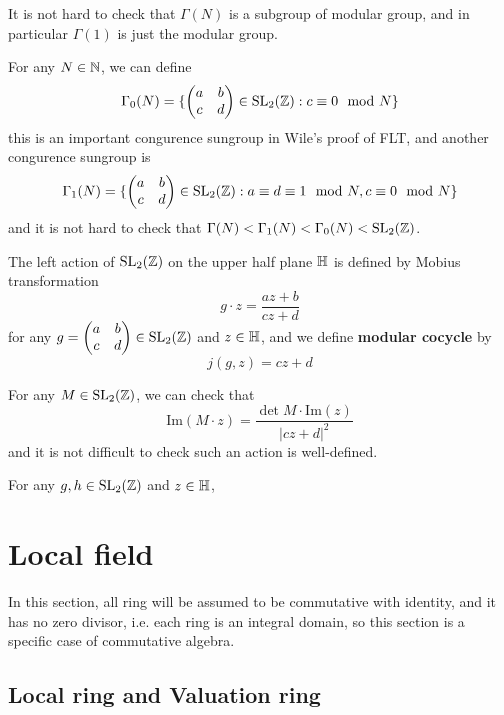 It is not hard to check that \(\Gamma(N)\) is a subgroup of modular group, and in particular \(\Gamma(1)\) is just the modular group.

\begin{example}
    For any \(N \in \mathbb{N}\), we can define
    \[\Gamma_0(N) = \{\begin{pmatrix}
    a & b \\ c & d 
    \end{pmatrix} \in \mathrm{SL}_2(\mathbb{Z}) : c \equiv 0 \mod N\}\]
    this is an important congurence sungroup in Wile's proof of FLT, and another congurence sungroup is
    \[\Gamma_1(N) = \{\begin{pmatrix}
    a & b \\ c & d 
    \end{pmatrix} \in \mathrm{SL}_2(\mathbb{Z}) : a \equiv d \equiv 1 \mod N, c \equiv 0 \mod N\}\]
    and it is not hard to check that \(\Gamma(N) < \Gamma_1(N) < \Gamma_0(N) < \mathrm{SL}_2(\mathbb{Z})\).
\end{example}


\begin{definition}
    The left action of \(\mathrm{SL}_2(\mathbb{Z})\) on the upper half plane \(\mathbb{H}\) is defined by Mobius transformation
\[g\cdot z =  \frac{az+b}{cz+d}\]
for any \(g = \begin{pmatrix} a & b \\ c & d \end{pmatrix} \in \mathrm{SL}_2(\mathbb{Z})\) and \(z \in \mathbb{H}\), and we define \textbf{modular cocycle }by
\[j(g,z) = cz+d\]
\end{definition}

For any \(M \in \mathrm{SL}_2(\mathbb{Z})\), we can check that
\[\mathrm{Im}(M\cdot z ) = \frac{\det M \cdot \mathrm{Im}(z)}{|cz+d|^2}\]
and it is not difficult to check such an action is well-defined.

\begin{lemma}
    For any \(g,h \in \mathrm{SL}_2(\mathbb{Z})\) and \(z \in \mathbb{H}\),
    
\end{lemma}

\section{Local field}

In this section, all ring will be assumed to be commutative with identity, and it has no zero divisor, i.e. each ring is an integral domain, so this section is a specific case of commutative algebra.
\subsection{Local ring and Valuation ring}

